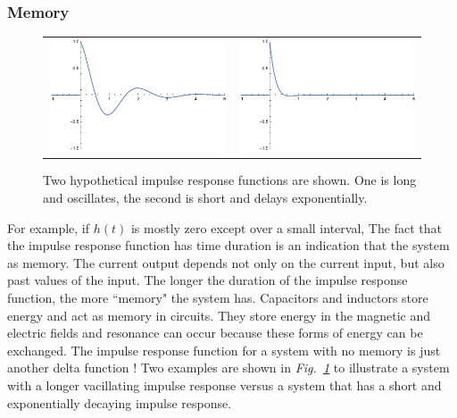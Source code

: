 \subsubsection{Memory}
\begin{figure}[tb]
\begin{tabular}{cc}
\includegraphics[width=.45\columnwidth]{impulse1_long.pdf} &
\includegraphics[width=.45\columnwidth]{impulse2_short.pdf} \\
\end{tabular}
\caption{Two hypothetical impulse response functions are shown.  One is long and oscillates, the second is short and delays exponentially.}
\label{fig:memory}
\end{figure}
For example, if $h(t)$ is mostly zero except over a small interval, 
The fact that the impulse response function has time duration is an indication that the system as memory.  The current output depends not only on the current input, but also past values of the input.  The longer the duration of the impulse response function, the more ``memory" the system has.  Capacitors and inductors store energy and act as memory in circuits.  They store energy in the magnetic and electric fields and resonance can occur because these forms of energy can be exchanged.  The impulse response function for a system with no memory is just another delta function !  Two examples are shown in \emph{Fig.~\ref{fig:memory}} to illustrate a system with a longer vacillating impulse response versus a system that has a short and exponentially decaying impulse response.  
